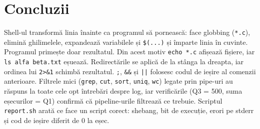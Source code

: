 \documentclass[12pt,a4paper]{article}
\begin{document}
\section*{Concluzii}
Shell-ul transformă linia înainte ca programul să pornească: face globbing (\texttt{*.c}), elimină ghilimelele, expandează variabilele și \texttt{\$(...)} și împarte linia în cuvinte. Programul primește doar rezultatul. Din acest motiv \texttt{echo *.c} afișează fișiere, iar \texttt{ls alfa beta.txt} eșuează. Redirectările se aplică de la stânga la dreapta, iar ordinea lui \texttt{2>\&1} schimbă rezultatul. \texttt{;}, \texttt{\&\&} și \texttt{||} folosesc codul de ieșire al comenzii anterioare. Filtrele mici (\texttt{grep}, \texttt{cut}, \texttt{sort}, \texttt{uniq}, \texttt{wc}) legate prin pipe-uri au răspuns la toate cele opt întrebări despre log, iar verificările (Q3 = 500, suma eșecurilor = Q1) confirmă că pipeline-urile filtrează ce trebuie. Scriptul \texttt{report.sh} arată ce face un script corect: shebang, bit de execuție, erori pe stderr și cod de ieșire diferit de 0 la eșec.
\end{document}
